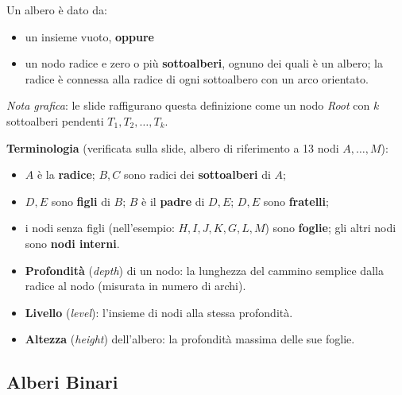 \documentclass[12pt, a4paper]{article}
\begin{document}
\begin{tcolorbox}[colback=lightergray!10, colframe=tocsec, title=\textbf{Albero Radicato -- Definizione 2 (Ricorsiva)}]
\label{def:albero-radicato-2}
Un albero è dato da:
\begin{itemize}
    \item un insieme vuoto, \textbf{oppure}
    \item un nodo radice e zero o più \textbf{sottoalberi}, ognuno dei quali è un albero; la radice è connessa alla radice di ogni sottoalbero con un arco orientato.
\end{itemize}
\end{tcolorbox}

\textit{Nota grafica}: le slide raffigurano questa definizione come un nodo \textit{Root} con $k$ sottoalberi pendenti $T_1,T_2,\ldots,T_k$.

\textbf{Terminologia} (verificata sulla slide, albero di riferimento a 13 nodi $A,\ldots,M$):
\begin{itemize}
    \item $A$ è la \textbf{radice}; $B,C$ sono radici dei \textbf{sottoalberi} di $A$;
    \item $D,E$ sono \textbf{figli} di $B$; $B$ è il \textbf{padre} di $D,E$; $D,E$ sono \textbf{fratelli};
    \item i nodi senza figli (nell'esempio: $H,I,J,K,G,L,M$) sono \textbf{foglie}; gli altri nodi sono \textbf{nodi interni}.
\end{itemize}

\begin{tcolorbox}[colback=lightergray!5, colframe=tocsubsec, title=\textbf{Profondità, Livello, Altezza}]
\begin{itemize}
    \item \textbf{Profondità} (\textit{depth}) di un nodo: la lunghezza del cammino semplice dalla radice al nodo (misurata in numero di archi).
    \item \textbf{Livello} (\textit{level}): l'insieme di nodi alla stessa profondità.
    \item \textbf{Altezza} (\textit{height}) dell'albero: la profondità massima delle sue foglie.
\end{itemize}
\end{tcolorbox}

\subsection{Alberi Binari}
\label{sec:alberi-binari}
\end{document}
